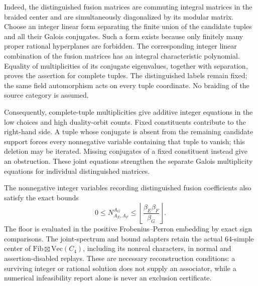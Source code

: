 Indeed, the distinguished fusion matrices are commuting integral
matrices in the braided center and are simultaneously diagonalized by
its modular matrix.  Choose an integer linear form separating the
finite union of the candidate tuples and all their Galois conjugates.
Such a form exists because only finitely many proper rational
hyperplanes are forbidden.  The corresponding integer linear
combination of the fusion matrices has an integral characteristic
polynomial.  Equality of multiplicities of its conjugate eigenvalues,
together with separation, proves the assertion for complete tuples.
The distinguished labels remain fixed; the same field automorphism
acts on every tuple coordinate.  No braiding of the source category is
assumed.

Consequently, complete-tuple multiplicities give additive integer
equations in the low choices and high duality-orbit counts.  Fixed
constituents contribute to the right-hand side.  A tuple whose
conjugate is absent from the remaining candidate support forces every
nonnegative variable containing that tuple to vanish; this deletion
may be iterated.  Missing conjugates of a fixed constituent instead
give an obstruction.  These joint equations strengthen the separate
Galois multiplicity equations for individual distinguished matrices.

The nonnegative integer variables recording distinguished fusion
coefficients also satisfy the exact bounds
\[
 0\le N_{A_E,A_F}^{A_G}
 \le \left\lfloor\frac{\beta_E\beta_F}{\beta_G}\right\rfloor.
\]
The floor is evaluated in the positive Frobenius--Perron embedding by
exact sign comparisons.  The joint-spectrum and bound adapters retain
the actual $64$-simple center of $\mathrm{Fib}\boxtimes\mathrm{Vec}(C_4)$,
including its nonreal characters, in normal and assertion-disabled
replays.  These are necessary reconstruction conditions: a surviving
integer or rational solution does not supply an associator, while a
numerical infeasibility report alone is never an exclusion certificate.

